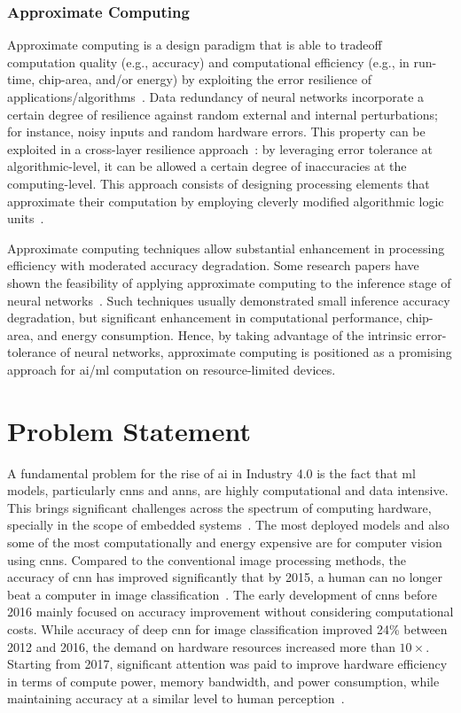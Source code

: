 \subsubsection{Approximate Computing}
Approximate computing is a design paradigm that is able to tradeoff computation quality (e.g., accuracy) and computational efficiency (e.g., in run-time, chip-area, and/or energy) by exploiting the error resilience of applications/algorithms~\cite{gillani2020exploiting, zhang2015approxann}. Data redundancy of neural networks incorporate a certain degree of resilience against random external and internal perturbations;
for instance, noisy inputs and random hardware errors. This property can be exploited in a cross-layer resilience approach~\cite{carter2010design}: by leveraging error tolerance at algorithmic-level, it can be allowed a certain degree of inaccuracies at the computing-level. This approach consists of designing processing elements that approximate their computation by employing cleverly modified algorithmic logic units~\cite{han2013approximate}.

Approximate computing techniques allow substantial enhancement in processing efficiency with moderated accuracy degradation. Some research papers have shown the feasibility of applying approximate computing to the inference stage of neural networks~\cite{lotrivc2012applicability, han2013approximate, du2014leveraging, mrazek2016design, sarwar2016multiplier, zervakis2021approximate}. Such techniques usually demonstrated small inference accuracy degradation, but significant enhancement in computational performance, chip-area, and energy consumption. Hence, by taking advantage of the intrinsic error-tolerance of neural networks, approximate computing is positioned as a promising approach for \gls{ai}/\gls{ml} computation on resource-limited devices.

\section{Problem Statement}
A fundamental problem for the rise of \gls{ai} in Industry 4.0 is the fact that \gls{ml} models, particularly \glspl{cnn} and \glspl{ann}, are highly computational and data intensive. This brings significant challenges across the spectrum of computing hardware, specially in the scope of embedded systems~\cite{venkataramani2016efficient}. The most deployed models and also some of the most computationally and energy expensive are for computer vision using \glspl{cnn}. Compared to the conventional image processing methods, the accuracy of \gls{cnn} has improved significantly that by 2015, a human can no longer beat a computer in image classification~\cite{loh20201}. The early development of \glspl{cnn} before 2016 mainly focused on accuracy improvement without considering computational costs. While accuracy of deep \gls{cnn} for image classification improved 24\% between 2012 and 2016, the demand on hardware resources increased more than $10\times$. Starting from 2017, significant attention was paid to improve hardware efficiency in terms of compute power, memory bandwidth, and power consumption, while maintaining accuracy at a similar level to human perception~\cite{venkataramani2016efficient}.

